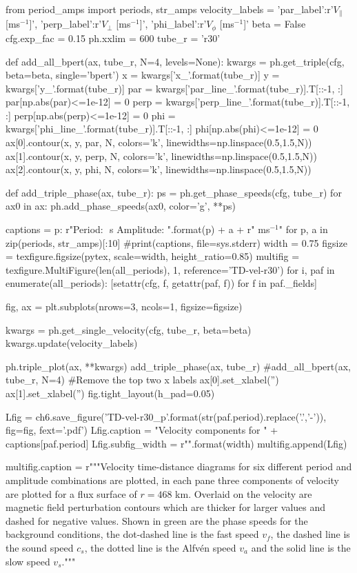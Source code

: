 \begin{pycode}[chapter6]

from period_amps import periods, str_amps
velocity_labels = {'par_label':r'$ V_\parallel$ [ms$^{-1}$]', 
                   'perp_label':r'$ V_\perp$ [ms$^{-1}$]',
                   'phi_label':r'$ V_\phi$ [ms$^{-1}$]'}
beta = False
cfg.exp_fac = 0.15
ph.xxlim = 600
tube_r = 'r30'

def add_all_bpert(ax, tube_r, N=4, levels=None):
    kwargs = ph.get_triple(cfg, beta=beta, single='bpert')
    x = kwargs['x_{}'.format(tube_r)]
    y = kwargs['y_{}'.format(tube_r)]
    par = kwargs['par_line_{}'.format(tube_r)].T[::-1, :]
    par[np.abs(par)<=1e-12] = 0
    perp = kwargs['perp_line_{}'.format(tube_r)].T[::-1, :]
    perp[np.abs(perp)<=1e-12] = 0
    phi = kwargs['phi_line_{}'.format(tube_r)].T[::-1, :]
    phi[np.abs(phi)<=1e-12] = 0
    ax[0].contour(x, y, par, N, colors='k', linewidths=np.linspace(0.5,1.5,N))
    ax[1].contour(x, y, perp, N, colors='k', linewidths=np.linspace(0.5,1.5,N))
    ax[2].contour(x, y, phi, N, colors='k', linewidths=np.linspace(0.5,1.5,N))	                   

def add_triple_phase(ax, tube_r):
    ps = ph.get_phase_speeds(cfg, tube_r)
    for ax0 in ax:
        ph.add_phase_speeds(ax0, color='g', **ps)

captions = {p: r"Period: ${}$ s Amplitude: ".format(p) + a + r" ms$^{{-1}}$" for p, a in zip(periods, str_amps)[:10]}
#print(captions, file=sys.stderr)
width = 0.75
figsize = texfigure.figsize(pytex, scale=width, height_ratio=0.85)
multifig = texfigure.MultiFigure(len(all_periods), 1, reference='TD-vel-r30')
for i, paf in enumerate(all_periods):
    [setattr(cfg, f, getattr(paf, f)) for f in paf._fields]

    fig, ax = plt.subplots(nrows=3, ncols=1, figsize=figsize)
    
    kwargs = ph.get_single_velocity(cfg, tube_r, beta=beta)
    kwargs.update(velocity_labels)
    
    ph.triple_plot(ax, **kwargs)
    add_triple_phase(ax, tube_r)
    #add_all_bpert(ax, tube_r, N=4)
    #Remove the top two x labels
    ax[0].set_xlabel('')
    ax[1].set_xlabel('')
    fig.tight_layout(h_pad=0.05)
    
    Lfig = ch6.save_figure('TD-vel-r30_p{}'.format(str(paf.period).replace('.','-')), fig=fig, fext='.pdf')
    Lfig.caption = "Velocity components for " + captions[paf.period]
    Lfig.subfig_width = r"{}\columnwidth".format(width)
    multifig.append(Lfig)

multifig.caption = r"""Velocity time-distance diagrams for six different period and amplitude combinations are plotted, in each pane three components of velocity are plotted for a flux surface of $r=468$ km. Overlaid on the velocity are magnetic field perturbation contours which are thicker for larger values and dashed for negative values. Shown in green are the phase speeds for the background conditions, the dot-dashed line is the fast speed $v_f$, the dashed line is the sound speed $c_s$, the dotted line is the Alfv\'en speed $v_a$ and the solid line is the slow speed $v_s$."""
\end{pycode}

